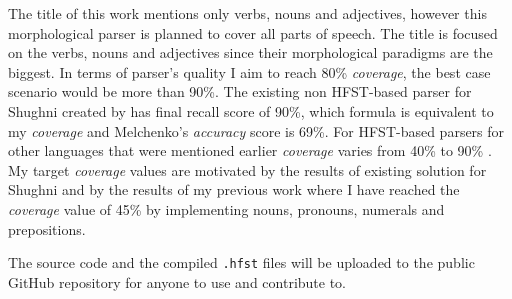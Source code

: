 \par The title of this work mentions only verbs, nouns and adjectives, however this morphological parser is planned to cover all parts of speech. The title is focused on the verbs, nouns and adjectives since their morphological paradigms are the biggest. In terms of parser's quality I aim to reach 80\% \textit{coverage}, the best case scenario would be more than 90\%. The existing non HFST-based parser for Shughni created by \textcite{melchenko_2021_parser} has final recall score of 90\%, which formula is equivalent to my \textit{coverage} and Melchenko's \textit{accuracy} score is 69\%. For HFST-based parsers for other languages that were mentioned earlier \textit{coverage} varies from 40\% \parencite{buntyakova_2023_twol} to 90\% \parencite{ivanova_free_2022}. My target \textit{coverage} values are motivated by the results of existing solution for Shughni and by the results of my previous work \parencite{osorgin_2024_twol} where I have reached the \textit{coverage} value of 45\% by implementing nouns, pronouns, numerals and prepositions.
\par The source code and the compiled \texttt{.hfst} files will be uploaded to the public GitHub repository for anyone to use and contribute to.